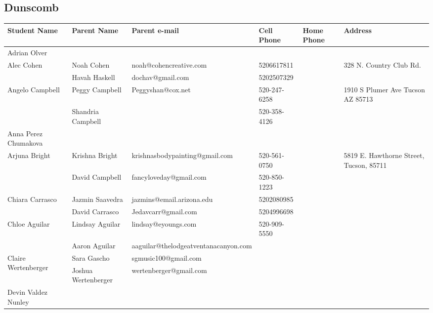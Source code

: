 \documentclass[landscape]{article}\usepackage[]{graphicx}\usepackage[]{color}
\begin{document}
\subsection{Dunscomb}
\begin{longtable}{|p{100pt}|p{100pt}|p{140pt}|p{60pt}|p{64pt}|p{120pt}|}
\textbf{Student Name} & \textbf{Parent Name} & \textbf{Parent e-mail} & \textbf{Cell Phone} & \textbf{Home Phone} & \textbf{Address}\\
\hline
\hline
\multirow{2}{100pt}{Adrian Olver} &  &  &  &  & \multirow{2}{120pt}{} \\
 &  &  &  &  & \\
\hline
\multirow{2}{100pt}{Alec Cohen} & Noah Cohen & noah@cohencreative.com & 5206617811 &  & \multirow{2}{120pt}{328 N. Country Club Rd.} \\
 & Havah Haskell & dochav@gmail.com & 5202507329 &  & \\
\hline
\multirow{2}{100pt}{Angelo Campbell} & Peggy Campbell  & Peggyshan@cox.net & 520-247-6258 &  & \multirow{2}{120pt}{1910 S Plumer Ave Tucson AZ 85713} \\
 & Shandria Campbell  &  & 520-358-4126 &  & \\
\hline
\multirow{2}{100pt}{Anna Perez Chumakova} &  &  &  &  & \multirow{2}{120pt}{} \\
 &  &  &  &  & \\
\hline
\multirow{2}{100pt}{Arjuna Bright} & Krishna Bright & krishnasbodypainting@gmail.com & 520-561-0750 &  & \multirow{2}{120pt}{5819 E. Hawthorne Street, Tucson, 85711} \\
 & David Campbell & fancyloveday@gmail.com & 520-850-1223 &  & \\
\hline
\multirow{2}{100pt}{Chiara Carrasco} & Jazmin Saavedra & jazmins@email.arizona.edu & 5202080985 &  & \multirow{2}{120pt}{} \\
 & David Carrasco & Jedavcarr@gmail.com & 5204996698 &  & \\
\hline
\multirow{2}{100pt}{Chloe Aguilar} & Lindsay Aguilar & lindsay@eyoungs.com & 520-909-5550 &  & \multirow{2}{120pt}{} \\
 & Aaron Aguilar & aaguilar@thelodgeatventanacanyon.com &  &  & \\
\hline
\multirow{2}{100pt}{Claire Wertenberger} & Sara Gascho & sgmusic100@gmail.com &  &  & \multirow{2}{120pt}{} \\
 & Joshua Wertenberger & wertenberger@gmail.com &  &  & \\
\hline
\multirow{2}{100pt}{Devin Valdez Nunley} &  &  &  &  & \multirow{2}{120pt}{} \\

\end{longtable}
\end{document}
